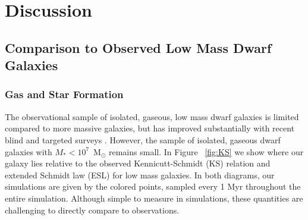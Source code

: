 \documentclass[twocolumn]{aastex61}
\begin{document}



\section{Discussion}
\label{sec:discussion}

\subsection{Comparison to Observed Low Mass Dwarf Galaxies}
\label{sec:observation}

\subsubsection{Gas and Star Formation}
\label{sec:gas_sf}

The observational sample of isolated, gaseous, low mass dwarf galaxies is limited compared to more massive galaxies, but has improved substantially with recent blind and targeted  surveys \citep[e.g.][]{Giovanelli2005, Geha2006, Geha2012, Walter2008, Cannon2011, Haynes2011, Hunter2012, Bradford2015, James2015, Tollerud2015, Sand2015, Wang2017}. However, the sample of isolated, gaseous dwarf galaxies with $M_{*} < 10^{7}$~M$_{\odot}$ remains small. In Figure ~\ref{fig:KS} we show where our galaxy lies relative to the observed Kennicutt-Schmidt (KS) relation and extended Schmidt law (ESL)  for low mass galaxies. In both diagrams, our simulations are given by the colored points, sampled every 1 Myr throughout the entire simulation. Although simple to measure in simulations, these quantities are challenging to directly compare to observations. 
\end{document}
